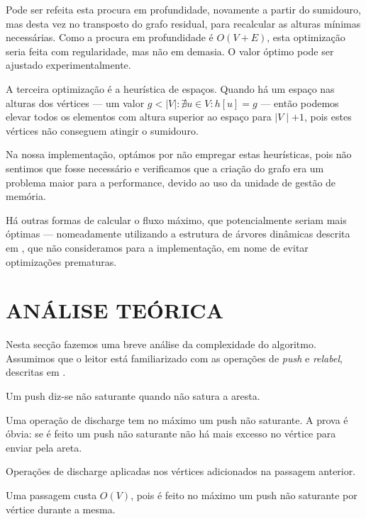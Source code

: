 \documentclass[a4paper, 12pt, conference, portuguese]{ieeeconf}
\begin{document}
Pode ser refeita esta procura em profundidade, novamente a partir
do sumidouro, mas desta vez no transposto do grafo residual, para recalcular as
alturas mínimas necessárias. Como a procura em
profundidade é $O(V + E)$, esta optimização seria feita com
regularidade, mas não em demasia. O valor óptimo pode ser
ajustado experimentalmente.

A terceira optimização é a heurística de espaços. Quando há um
espaço nas alturas dos vértices --- um valor $g < \mid V \mid:
\nexists u \in V : h[u] = g$ --- então podemos elevar todos os
elementos com altura superior ao espaço para $\mid V \mid + 1$,
pois estes vértices não conseguem  atingir o
sumidouro.\cite{goldberg}

Na nossa implementação, optámos por não empregar estas
heurísticas, pois não sentimos que fosse necessário e verificamos
que a criação do grafo era um problema maior para a performance,
devido ao uso da unidade de gestão de memória.

Há outras formas de calcular o fluxo máximo, que potencialmente seriam mais óptimas ---
nomeadamente utilizando a estrutura de árvores dinâmicas
descrita em \cite{pre-flow}, que não consideramos para a
implementação, em nome de evitar optimizações prematuras.

\section{ANÁLISE TEÓRICA}\label{theoric}

Nesta secção fazemos uma breve análise da complexidade do
algoritmo. Assumimos que o leitor está familiarizado com as
operações de \textit{push} e \textit{relabel}, descritas em
\cite{pre-flow}.

\begin{defin} 
  Um push diz-se não saturante quando não satura a aresta.
\end{defin}

\begin{lemma} Uma operação de discharge tem no máximo um push não
  saturante. A prova é óbvia: se é feito um push não saturante
  não há mais excesso no vértice para enviar pela areta.
\end{lemma}

\begin{defin} [Passagem]
  Operações de discharge aplicadas nos vértices adicionados na
  passagem anterior.
\end{defin}

\begin{lemma}
  Uma passagem custa $O(V)$, pois é feito no máximo um push não
  saturante por vértice durante a mesma.
\end{lemma}
\end{document}
